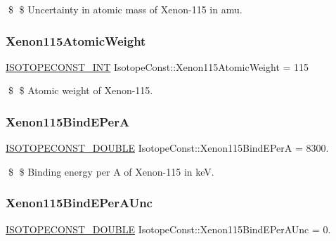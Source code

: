 \$ \$ Uncertainty in atomic mass of Xenon-\/115 in amu. \mbox{\label{group___isotope_const-_xenon-_xe115_gae1a040892680ed3ac25396e32496966f}} 
\subsubsection{\texorpdfstring{Xenon115\+Atomic\+Weight}{Xenon115AtomicWeight}}
{\footnotesize\ttfamily \mbox{\hyperlink{group___isotope_const-_macros_ga5f18360b3e99483a35c32d789e62621c}{I\+S\+O\+T\+O\+P\+E\+C\+O\+N\+S\+T\+\_\+\+I\+NT}} Isotope\+Const\+::\+Xenon115\+Atomic\+Weight = 115}

\$ \$ Atomic weight of Xenon-\/115. \mbox{\label{group___isotope_const-_xenon-_xe115_ga3640ad82dd971b208829a90e38a7e90b}} 
\subsubsection{\texorpdfstring{Xenon115\+Bind\+E\+PerA}{Xenon115BindEPerA}}
{\footnotesize\ttfamily \mbox{\hyperlink{group___isotope_const-_macros_ga8f45a7272ce02c0b4c65c44636ed719a}{I\+S\+O\+T\+O\+P\+E\+C\+O\+N\+S\+T\+\_\+\+D\+O\+U\+B\+LE}} Isotope\+Const\+::\+Xenon115\+Bind\+E\+PerA = 8300.}

\$ \$ Binding energy per A of Xenon-\/115 in keV. \mbox{\label{group___isotope_const-_xenon-_xe115_gae3dfa61199d45b97910d6df3ac87ab99}} 
\subsubsection{\texorpdfstring{Xenon115\+Bind\+E\+Per\+A\+Unc}{Xenon115BindEPerAUnc}}
{\footnotesize\ttfamily \mbox{\hyperlink{group___isotope_const-_macros_ga8f45a7272ce02c0b4c65c44636ed719a}{I\+S\+O\+T\+O\+P\+E\+C\+O\+N\+S\+T\+\_\+\+D\+O\+U\+B\+LE}} Isotope\+Const\+::\+Xenon115\+Bind\+E\+Per\+A\+Unc = 0.}

